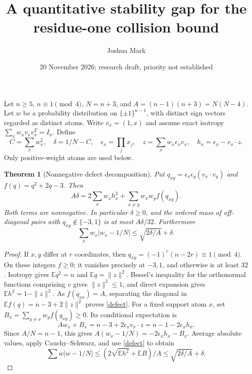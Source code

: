 \documentclass[11pt]{article}
\title{A quantitative stability gap for the residue-one collision bound}
\author{Joshua Mark}
\date{20 November 2026; research draft, priority not established}
\newtheorem{theorem}{Theorem}
\newcommand{\E}{\mathbb E}
\begin{document}
\maketitle
Let $n\ge5$, $n\equiv1\pmod4$, $N=n+3$, and
$A=(n-1)(n+3)=N(N-4)$. Let $w$ be a probability distribution on
$\{\pm1\}^{n-1}$, with distinct sign vectors regarded as distinct atoms.
Write $v_x=(1,x)$ and assume exact isotropy
$\sum_x w_xv_xv_x^T=I_n$. Define
\[
 C=\sum_xw_x^2,\quad \delta=1/N-C,\quad
 \epsilon_x=\prod_jx_j,\quad z=\sum_xw_x\epsilon_xv_x,
 \quad h_x=\epsilon_x-v_x\cdot z.
\]
Only positive-weight atoms are used below.

\begin{theorem}[Nonnegative defect decomposition]
Put $q_{xy}=\epsilon_x\epsilon_y(v_x\cdot v_y)$ and
$f(q)=q^2+2q-3$. Then
\begin{equation}\label{defect}
 A\delta=2\sum_xw_xh_x^2+
 \sum_{x\ne y}w_xw_y f(q_{xy}).
\end{equation}
Both terms are nonnegative. In particular $\delta\ge0$, and the
ordered mass of off-diagonal pairs with $q_{xy}\notin\{-3,1\}$ is
at most $A\delta/32$. Furthermore
\begin{equation}\label{disp}
 \sum_xw_x|w_x-1/N|\le \sqrt{2\delta/A}+\delta.
\end{equation}
\end{theorem}
\begin{proof}
If $x,y$ differ at $r$ coordinates, then
$q_{xy}=(-1)^r(n-2r)\equiv1\pmod4$. On these integers $f\ge0$;
it vanishes precisely at $-3,1$, and otherwise is at least $32$.
Isotropy gives $\E q^2=n$ and $\E q=\|z\|^2$.
Bessel's inequality for the orthonormal functions comprising $v$ gives
$\|z\|^2\le1$, and direct expansion gives
$\E h^2=1-\|z\|^2$. As $f(q_{xx})=A$, separating the diagonal in
$\E f(q)=n-3+2\|z\|^2$ proves \eqref{defect}.
For a fixed support atom $x$, set
$B_x=\sum_{y\ne x}w_yf(q_{xy})\ge0$. Its conditional expectation is
\[
 Aw_x+B_x=n-3+2\epsilon_x v_x\cdot z
 =n-1-2\epsilon_xh_x.
\]
Since $A/N=n-1$, this gives
$A(w_x-1/N)=-2\epsilon_xh_x-B_x$. Average absolute values,
apply Cauchy--Schwarz, and use \eqref{defect} to obtain
\[
 \sum w|w-1/N|\le (2\sqrt{\E h^2}+\E B)/A
 \le\sqrt{2\delta/A}+\delta.
\]
\end{proof}
\end{document}
